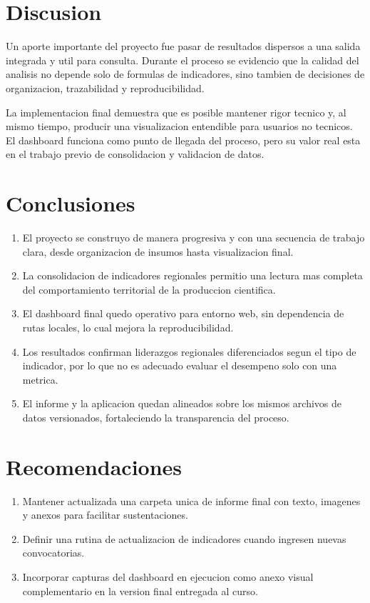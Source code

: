 \documentclass[12pt,letterpaper]{article}
\begin{document}
\section{Discusion}

Un aporte importante del proyecto fue pasar de resultados dispersos a una salida integrada y util para consulta. Durante el proceso se evidencio que la calidad del analisis no depende solo de formulas de indicadores, sino tambien de decisiones de organizacion, trazabilidad y reproducibilidad.

La implementacion final demuestra que es posible mantener rigor tecnico y, al mismo tiempo, producir una visualizacion entendible para usuarios no tecnicos. El dashboard funciona como punto de llegada del proceso, pero su valor real esta en el trabajo previo de consolidacion y validacion de datos.

\section{Conclusiones}

\begin{enumerate}[label=\arabic*.]
  \item El proyecto se construyo de manera progresiva y con una secuencia de trabajo clara, desde organizacion de insumos hasta visualizacion final.
  \item La consolidacion de indicadores regionales permitio una lectura mas completa del comportamiento territorial de la produccion cientifica.
  \item El dashboard final quedo operativo para entorno web, sin dependencia de rutas locales, lo cual mejora la reproducibilidad.
  \item Los resultados confirman liderazgos regionales diferenciados segun el tipo de indicador, por lo que no es adecuado evaluar el desempeno solo con una metrica.
  \item El informe y la aplicacion quedan alineados sobre los mismos archivos de datos versionados, fortaleciendo la transparencia del proceso.
\end{enumerate}

\section{Recomendaciones}

\begin{enumerate}[label=\arabic*.]
  \item Mantener actualizada una carpeta unica de informe final con texto, imagenes y anexos para facilitar sustentaciones.
  \item Definir una rutina de actualizacion de indicadores cuando ingresen nuevas convocatorias.
  \item Incorporar capturas del dashboard en ejecucion como anexo visual complementario en la version final entregada al curso.
\end{enumerate}
\end{document}
